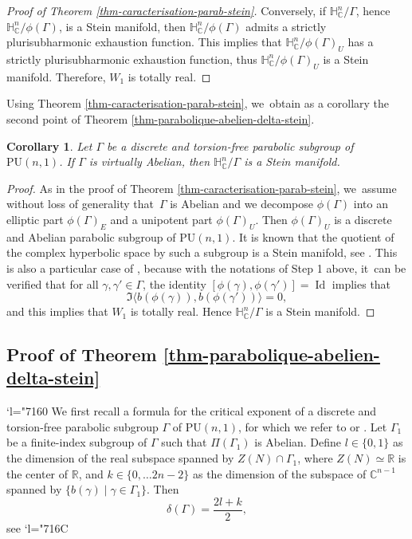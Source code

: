 \documentclass[11pt]{article}
\newcommand{\Changel}{\mathcode`l="7160}
\newcommand{\Changelback}{\mathcode`l="716C}
\newtheorem{corollary}[theorem]{Corollary}
\theoremstyle{definition}
\newcommand{\C}{\mathbb{C}}
\newcommand{\R}{\mathbb{R}}
\newcommand{\HNC}{\mathbb{H}^{n}_{\C}}
\newcommand{\PU}{\mathrm{PU}}
\DeclareMathOperator{\Id}{Id}
\def\C{\mathbb{C}}
\newcommand{\HNC}{\mathbb{H}^{n}_{\C}}
\newcommand{\PU}{\mathrm{PU}}
\begin{document}
\begin{proof}[Proof of Theorem \ref{thm-caracterisation-parab-stein}]
Conversely, if $\HNC/\Gamma$, hence $\HNC/\phi(\Gamma)$, is a Stein manifold, then $\HNC/\phi(\Gamma)$ admits a strictly plurisubharmonic exhaustion function. This implies that $\HNC/\phi(\Gamma)_U$ has a strictly plurisubharmonic exhaustion function, thus $\HNC/\phi(\Gamma)_U$ is a Stein manifold. Therefore, $W_1$ is totally real.
\end{proof}

Using Theorem \ref{thm-caracterisation-parab-stein}, we~obtain as a corollary the second point of Theorem \ref{thm-parabolique-abelien-delta-stein}.

\begin{corollary}\label{cor-virt-ab-stein}
Let $\Gamma$ be a discrete and torsion-free parabolic subgroup of $\PU(n,1)$. If $\Gamma$ is virtually Abelian, then $\HNC/\Gamma$ is a Stein manifold.
\end{corollary}

\begin{proof}
As in the proof of Theorem \ref{thm-caracterisation-parab-stein}, we~assume without loss of generality that~$\Gamma$ is Abelian and we decompose $\phi(\Gamma)$ into an elliptic part $\phi(\Gamma)_E$ and a unipotent part $\phi(\Gamma)_U$. Then $\phi(\Gamma)_U$ is a discrete and Abelian parabolic subgroup of $\PU(n,1)$. It is known that the quotient of the complex hyperbolic space by such a subgroup is a Stein manifold, see \cite{chenDiscreteGroupsHolomorphic2013}. This is also a particular case of \cite[Th.\,1.4]{miebachQuotientsBoundedHomogeneous2024}, because with the notations of Step 1 above, it~can be verified that for all $\gamma,\gamma'\in \Gamma$, the identity $[\phi(\gamma),\phi(\gamma')]=\Id$ implies that
\begin{equation*}
\Im\langle b(\phi(\gamma)),b(\phi(\gamma'))\rangle = 0,
\end{equation*}
and this implies that $W_1$ is totally real. Hence $\HNC/\Gamma$ is a Stein manifold.
\end{proof}
\subsection{Proof of Theorem \ref{thm-parabolique-abelien-delta-stein}}
\Changel
We first recall a formula for the critical exponent of a discrete and torsion-free parabolic subgroup $\Gamma$ of $\PU(n,1)$, for which we refer to \cite{corletteLimitSetsDiscrete1999} or \cite[\S3]{dalboSeriesPoincareGroupes2000}. Let $\Gamma_1$ be a finite-index subgroup of $\Gamma$ such that $\Pi(\Gamma_1)$ is Abelian. Define $l\in\{0,1\}$ as the dimension of the real subspace spanned by $Z(N)\cap \Gamma_1$, where $Z(N)\simeq\R$ is the center of $\R$, and $k\in\{0,\dots 2n-2\}$ as the dimension of the subspace of $\C^{n-1}$ spanned by $\{b(\gamma) \mid \gamma \in \Gamma_1\}$. Then\begin{equation}\label{eq-delta-parab}
\delta(\Gamma) = \frac{2l+k}{2},
\end{equation}
see \cite[Proof of Lem.\,3.5]{corletteLimitSetsDiscrete1999}
\Changelback
\end{document}
